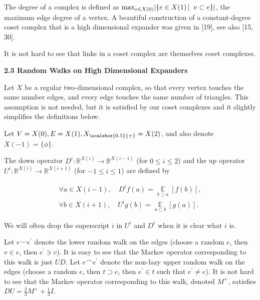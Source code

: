 


The degree of a complex is defined as $\max_{v\in X(0)}\lvert\left\{e\in X(1)\left|\;\vphantom{e\in X(1)v\subset e}\right.v\subset e\right\}\rvert$, the maximum edge degree of a vertex. A beautiful construction of a constant-degree coset complex that is a high dimensional expander was given in [19], see also [15, 30].\par




It is not hard to see that links in a coset complex are themselves coset complexes.\par





\par\medskip\noindent\textbf{
2.3 Random Walks on High Dimensional Expanders}\par




Let $X$ be a regular two-dimensional complex, so that every vertex touches the same number edges, and every edge touches the same number of triangles. This assumption is not needed, but it is satisfied by our coset complexes and it slightly simplifies the definitions below.\par




Let $V=X(0),E=X(1),{X}_{\scalebox{0.5}{+}}=X(2)$, and also denote $X(-1)=\{\phi\}$.\par




The down operator $D^{i}:\mathbb{R}^{X(i)}\to\mathbb{R}^{X(i-1)}$ (for $0\leq i\leq 2$) and the up operator $U^{i}:\mathbb{R}^{X(i)}\to\mathbb{R}^{X(i+1)}$ (for $-1\leq i\leq 1$) are defined by\par


\[\begin{gathered}
\displaystyle\forall a\in X(i-1),\quad D^{i}f(a) \displaystyle=\operatorname*{\mathbb{E}}_{b\supset a}[f(b)], \\
\displaystyle\forall b\in X(i+1),\quad U^{i}g(b) \displaystyle=\operatorname*{\mathbb{E}}_{a\subset b}[g(a)].
\end{gathered}\]


We will often drop the superscript $i$ in $U^{i}$ and $D^{i}$ when it is clear what $i$ is.\par




Let $e\smallsmile e^{\prime}$ denote the lower random walk on the edges (choose a random $e$, then $v\in e$, then $e^{\prime}\ni v$). It is easy to see that the Markov operator corresponding to this walk is just $UD$.
Let $e\smallfrown e^{\prime}$ denote the non-lazy upper random walk on the edges (choose a random $e$, then $t\supset e$, then $e^{\prime}\in t$ such that $e^{\prime}\neq e$). It is not hard to see that the Markov operator corresponding to this walk, denoted $M^{+}$, satisfies $DU=\frac{2}{3}M^{+}+\frac{1}{3}I$.\par




